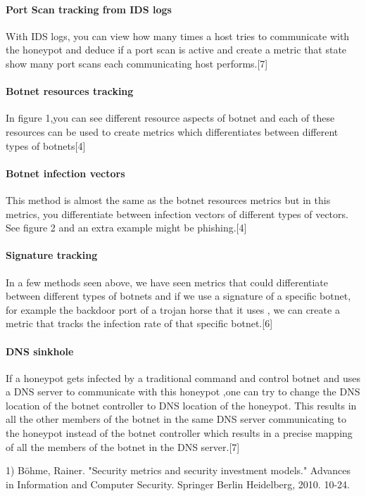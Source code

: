 \paragraph{Port Scan tracking from IDS logs}
With IDS logs, you can view how many times a host tries to communicate with the honeypot and deduce if a port scan is active and create a metric that state show many port scans each communicating host performs.[7]

\paragraph{Botnet resources tracking}
In figure 1,you can see different resource aspects of botnet and each of these resources can be used to create metrics which differentiates between different types of botnets[4]


\paragraph{Botnet infection vectors}
This method is almost the same as the botnet resources metrics but in this metrics, you differentiate between  infection vectors of different types of vectors. See figure 2 and an extra example might be phishing.[4]


\paragraph{Signature tracking}
In a few methods seen above, we have seen metrics that could differentiate between different types of botnets and if we use a signature of a specific botnet, for example the backdoor port of a trojan horse that it uses , we can create a metric that tracks the infection rate of that specific botnet.[6]

\paragraph{DNS sinkhole}
If a honeypot gets infected by a traditional command and control botnet  and uses a DNS server to communicate with this honeypot ,one can try to change the DNS location of the botnet controller to DNS location of the honeypot. This results in all the other members of the botnet in the same DNS server communicating to the honeypot instead of the botnet controller which results in a precise mapping of all the members of the botnet in the DNS server.[7]



1) Böhme, Rainer. "Security metrics and security investment models." Advances in Information and Computer Security. Springer Berlin Heidelberg, 2010. 10-24.

